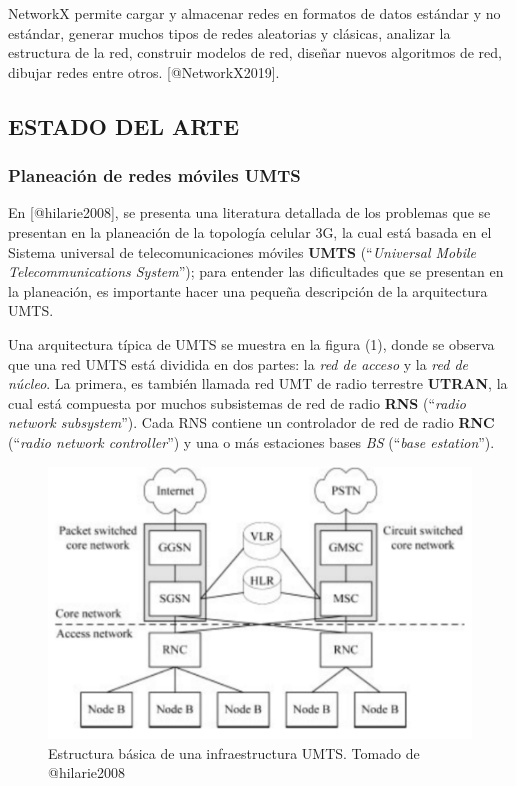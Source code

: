 \documentclass[]{article}
\begin{document}
NetworkX permite cargar y almacenar redes en formatos de datos estándar
y no estándar, generar muchos tipos de redes aleatorias y clásicas,
analizar la estructura de la red, construir modelos de red, diseñar
nuevos algoritmos de red, dibujar redes entre otros.
{[}@NetworkX2019{]}.

\subsection{ESTADO DEL ARTE}\label{estado-del-arte}

\subsubsection{Planeación de redes móviles
UMTS}\label{planeaciuxf3n-de-redes-muxf3viles-umts}

En {[}@hilarie2008{]}, se presenta una literatura detallada de los
problemas que se presentan en la planeación de la topología celular 3G,
la cual está basada en el Sistema universal de telecomunicaciones
móviles \textbf{UMTS} (``\emph{Universal Mobile Telecommunications
System}''); para entender las dificultades que se presentan en la
planeación, es importante hacer una pequeña descripción de la
arquitectura UMTS.

Una arquitectura típica de UMTS se muestra en la figura (1), donde se
observa que una red UMTS está dividida en dos partes: la \emph{red de
acceso} y la \emph{red de núcleo}. La primera, es también llamada red
UMT de radio terrestre \textbf{UTRAN}, la cual está compuesta por muchos
subsistemas de red de radio \textbf{RNS} (``\emph{radio network
subsystem}''). Cada RNS contiene un controlador de red de radio
\textbf{RNC} (``\emph{radio network controller}'') y una o más
estaciones bases \emph{BS} (``\emph{base estation}'').

\begin{figure}
\centering
\includegraphics{UMTS.pdf}
\caption{Estructura básica de una infraestructura UMTS. Tomado de
@hilarie2008}
\end{figure}
\end{document}
